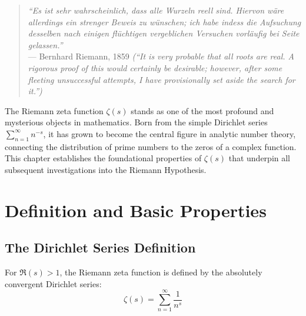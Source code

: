 

\begin{quote}
\textit{``Es ist sehr wahrscheinlich, dass alle Wurzeln reell sind. Hiervon wäre allerdings ein strenger Beweis zu wünschen; ich habe indess die Aufsuchung desselben nach einigen flüchtigen vergeblichen Versuchen vorläufig bei Seite gelassen.''} \\
--- Bernhard Riemann, 1859 \textit{(``It is very probable that all roots are real. A rigorous proof of this would certainly be desirable; however, after some fleeting unsuccessful attempts, I have provisionally set aside the search for it.'')}
\end{quote}

The Riemann zeta function $\zeta(s)$ stands as one of the most profound and mysterious objects in mathematics. Born from the simple Dirichlet series $\sum_{n=1}^{\infty} n^{-s}$, it has grown to become the central figure in analytic number theory, connecting the distribution of prime numbers to the zeros of a complex function. This chapter establishes the foundational properties of $\zeta(s)$ that underpin all subsequent investigations into the Riemann Hypothesis.

\section{Definition and Basic Properties}
\label{sec:definition_basic}

\subsection{The Dirichlet Series Definition}

\begin{definition}
\label{def:zeta_original}
For $\Re(s) > 1$, the Riemann zeta function is defined by the absolutely convergent Dirichlet series:
\begin{equation}
\zeta(s) = \sum_{n=1}^{\infty} \frac{1}{n^s}
\label{eq:zeta_dirichlet}
\end{equation}
\end{definition}

